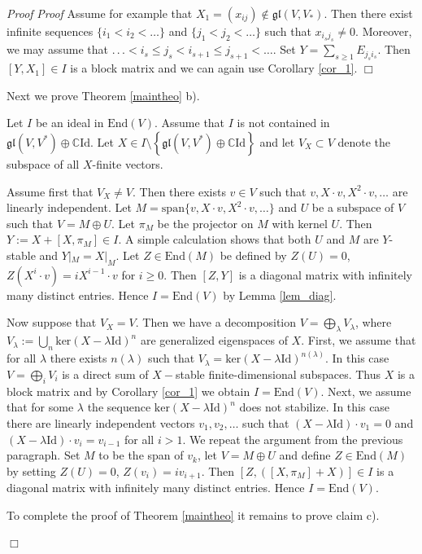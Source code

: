 \documentclass{svmult}
\renewenvironment{proof}{ \emph{Proof}}{$\Box$}
\newcommand {\CC} {\mathbb {C}}
\newcommand{\id}{\mathrm{Id}}
\renewcommand{\span}{\mathrm{span}}
\newcommand{\gl}{\mathfrak{gl}}
\newcommand{\Ker}{\mathrm{ker}}
\newcommand{\End}{\mathrm{End}}
\begin{document}
\begin{proof}
\begin{proof}
 Assume for example that $X_1 = (x_{ij}) \notin \gl(V,V_*)$. Then  there exist infinite sequences $\lbrace i_1<i_2<\dots\rbrace$ and $\lbrace j_1<j_2<\dots\rbrace$ such that
$x_{i_sj_s}\neq 0$. Moreover, we may assume that $.\,.\,.< i_s \leq j_s < i_{s+1} \leq j_{s+1} <\dots$. Set
$Y=\sum_{s\geq 1} E_{j_si_s}$. Then $[Y,X_1]\in I$ is a block matrix and we can again use Corollary \ref{cor_1}.
\end{proof}

Next we prove Theorem \ref{maintheo} b).

Let $I$ be an ideal in $\End(V)$. Assume that $I$ is not contained in
$\gl(V,V^*) \oplus \CC \id$. Let 
$X\in I\setminus \left\lbrace\gl(V,V^*) \oplus \CC \id\right\rbrace$ 
and let $V_X \subset V$ denote the subspace  of all $X$-finite vectors. 

Assume first that $V_X\neq V$. Then there exists $v\in V$ such that $v,X\cdot v,X^2\cdot v,\dots$ are linearly 
independent. Let $M=\span\{v,X\cdot v,X^2\cdot v,\dots\}$ and $U$ be a
subspace of $V$ such that $V=M\oplus U$. Let $\pi_M$ be the projector
on $M$ with kernel $U$. Then $Y:=X+[X,\pi_M]\in I$. A simple
calculation shows that both $U$ and $M$ are $Y$-stable and
$Y|_M=X|_M$. Let $Z\in \End(M)$ be defined by $Z(U)=0$, $Z(X^i\cdot
v)=iX^{i-1}\cdot v$ for $i\geq 0$. Then $[Z,Y]$ is a diagonal matrix
with infinitely many distinct entries. Hence $I=\End(V)$ by Lemma \ref{lem_diag}.

Now suppose that $V_X=V$. Then we have a decomposition
$V=\bigoplus_{\lambda} V_\lambda$, where 
$V_\lambda:=\bigcup_n \Ker (X-\lambda\id)^n$ are generalized
eigenspaces of $X$. First, we assume that for all 
$\lambda$ there exists $n(\lambda)$ such that $V_\lambda=\Ker
(X-\lambda\id)^{n(\lambda)}$. 
In this case $V=\bigoplus_i V_i$ is a direct sum of $X-$stable
finite-dimensional subspaces. Thus $X$ is a block matrix and by 
Corollary \ref{cor_1} we obtain $I=\End (V)$. Next, we assume that
for some $\lambda$ the sequence  $\Ker (X-\lambda\id)^n$ does not
stabilize. In this case there are linearly independent vectors
$v_1,v_2,\dots$ such that $(X-\lambda\id)\cdot v_1=0$ and
$(X-\lambda\id)\cdot v_i=v_{i-1}$ for all $i>1$. 
We repeat the argument from the previous paragraph. Set $M$ to be the span of 
$v_k$, let $V=M\oplus U$ and define $Z \in \End(M)$ by setting $Z(U)=0$, $Z(v_i)=iv_{i+1}$. Then $[Z,([X,\pi_M]+X)]\in I$  is a diagonal matrix with infinitely many distinct entries. Hence $I=\End(V)$.

To complete the proof of Theorem \ref{maintheo} it remains to prove claim c).


\end{proof}
\end{document}
